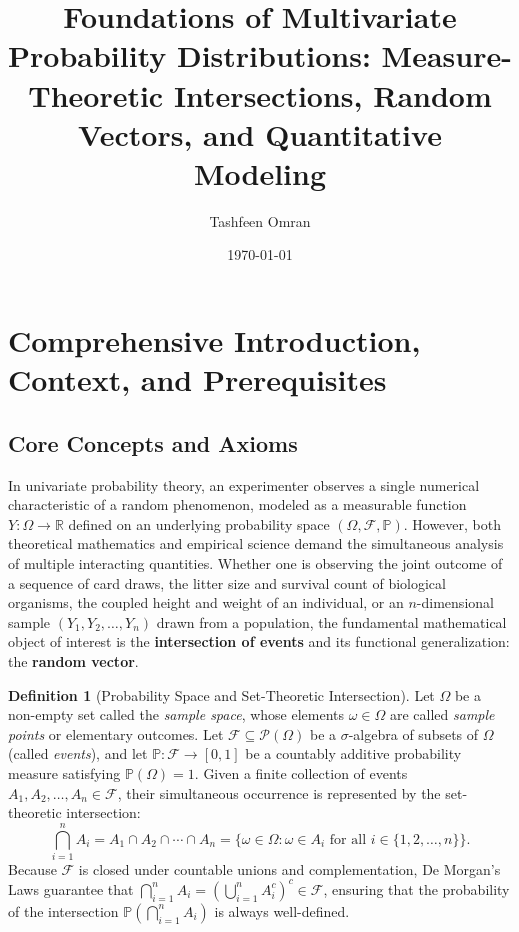 \documentclass[11pt, letterpaper]{article}
\title{\textbf{Foundations of Multivariate Probability Distributions: Measure-Theoretic Intersections, Random Vectors, and Quantitative Modeling}}
\author{Tashfeen Omran}
\date{\today}
\theoremstyle{definition}
\newtheorem{definition}{Definition}[section]
\theoremstyle{remark}
\newcommand{\R}{\mathbb{R}}
\newcommand{\Prob}{\mathbb{P}}
\newcommand{\F}{\mathcal{F}}
\begin{document}
\maketitle
\tableofcontents
\newpage

\section{Comprehensive Introduction, Context, and Prerequisites}

\subsection{Core Concepts and Axioms}

In univariate probability theory, an experimenter observes a single numerical characteristic of a random phenomenon, modeled as a measurable function $Y : \Omega \to \R$ defined on an underlying probability space $(\Omega, \F, \Prob)$. However, both theoretical mathematics and empirical science demand the simultaneous analysis of multiple interacting quantities. Whether one is observing the joint outcome of a sequence of card draws, the litter size and survival count of biological organisms, the coupled height and weight of an individual, or an $n$-dimensional sample $(Y_1, Y_2, \dots, Y_n)$ drawn from a population, the fundamental mathematical object of interest is the \textbf{intersection of events} and its functional generalization: the \textbf{random vector}.

\begin{definition}[Probability Space and Set-Theoretic Intersection]
Let $\Omega$ be a non-empty set called the \emph{sample space}, whose elements $\omega \in \Omega$ are called \emph{sample points} or elementary outcomes. Let $\F \subseteq \mathcal{P}(\Omega)$ be a $\sigma$-algebra of subsets of $\Omega$ (called \emph{events}), and let $\Prob : \F \to [0, 1]$ be a countably additive probability measure satisfying $\Prob(\Omega) = 1$. Given a finite collection of events $A_1, A_2, \dots, A_n \in \F$, their simultaneous occurrence is represented by the set-theoretic intersection:
\[
\bigcap_{i=1}^{n} A_i = A_1 \cap A_2 \cap \cdots \cap A_n = \{\omega \in \Omega : \omega \in A_i \text{ for all } i \in \{1, 2, \dots, n\}\}.
\]
Because $\F$ is closed under countable unions and complementation, De Morgan's Laws guarantee that $\bigcap_{i=1}^{n} A_i = \left(\bigcup_{i=1}^{n} A_i^c\right)^c \in \F$, ensuring that the probability of the intersection $\Prob\left(\bigcap_{i=1}^{n} A_i\right)$ is always well-defined.
\end{definition}
\end{document}
